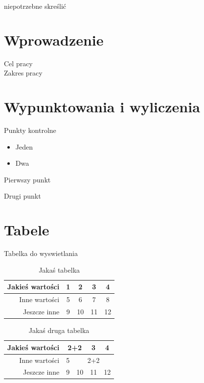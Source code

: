 \documentclass[12pt,a4paper]{report}
\begin{document}
\noindent * niepotrzebne skreślić 
\newpage
\tableofcontents

\newpage
\chapter*{Wprowadzenie}
Cel pracy \\
Zakres pracy
\newpage
\chapter{Wypunktowania i wyliczenia}
Punkty kontrolne
\begin{itemize}
\item{Jeden}
\item{Dwa} 
\end{itemize}
\begin{list}{*}{Punkty kontrolne}
\item Pierwszy punkt
\item Drugi punkt
\end{list}
\newpage
\chapter{Tabele}
Tabelka do wyswietlania\\
\begin{table}[h]
    \centering
    \caption{Jakaś tabelka}
    \begin{tabular}{|r|c|c|c|c|}
    \hline
        Jakieś wartości &1&2&3&4\\
        \hline
        Inne wartości &5&6&7&8\\ 
        \hline
        Jeszcze inne &9&10&11&12\\
        \hline
    \end{tabular}
 \end{table}
 \begin{table}[h]
    \centering
    \caption{Jakaś druga tabelka}
    \begin{tabular}{|r|c|c|c|c|}
    \hline
        Jakieś wartości &\multicolumn{2}{c|}{2+2}&3&4\\
        \hline
        Inne wartości &5&\multicolumn{3}{c|}{2+2}\\ 
        \hline
        Jeszcze inne &9&10&11&12\\
        \hline
    \end{tabular}
 \end{table}
\newpage
\end{document}
